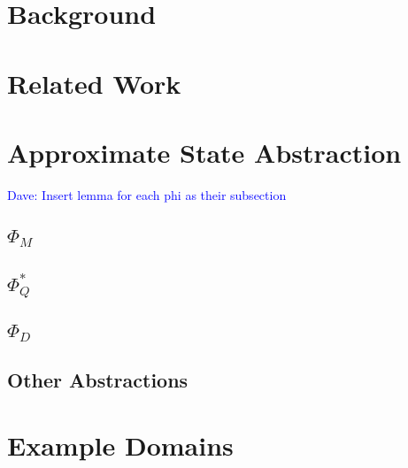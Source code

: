 \documentclass[11pt]{article}
\newcommand\dnote[1]{\textcolor{blue}{Dave: #1}}
\begin{document}
\section{Background}




\section{Related Work}






\section{Approximate State Abstraction}

\dnote{Insert lemma for each phi as their subsection}


\subsection{$\Phi_M$}



\subsection{$\Phi_Q^*$}



\subsection{$\Phi_D$}



\subsection{Other Abstractions}




\section{Example Domains}
\end{document}
